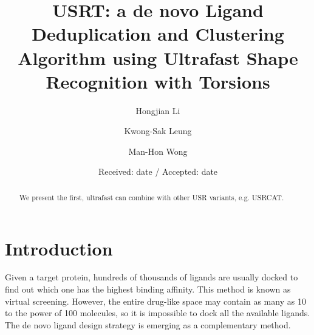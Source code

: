 \documentclass[twocolumn]{svjour3}          %
\begin{document}
\title{USRT: a de novo Ligand Deduplication and Clustering Algorithm using Ultrafast Shape Recognition with Torsions
}


\author{Hongjian Li \and Kwong-Sak Leung \and Man-Hon Wong}



\date{Received: date / Accepted: date}

\maketitle

\begin{abstract}

We present the first,
ultrafast
can combine with other USR variants, e.g. USRCAT.

\end{abstract}

\section{Introduction}
\label{intro}

Given a target protein, hundreds of thousands of ligands are usually docked to find out which one has the highest binding affinity. This method is known as virtual screening. However, the entire drug-like space may contain as many as 10 to the power of 100 molecules, so it is impossible to dock all the available ligands. The de novo ligand design strategy is emerging as a complementary method.
\end{document}
